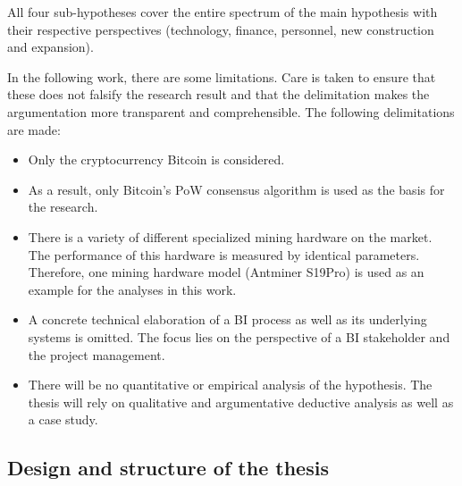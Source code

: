 All four sub-hypotheses cover the entire spectrum of the main hypothesis with their respective perspectives (technology, finance, personnel, new construction and expansion).

In the following work, there are some limitations. Care is taken to ensure that these does not falsify the research result 
and that the delimitation makes the argumentation more transparent and comprehensible. The following delimitations are made: 

\begin{itemize} 
    \item Only the cryptocurrency Bitcoin is considered. 
    \item As a result, only Bitcoin's \ac{PoW} consensus algorithm is used as the basis for the research. 
    \item There is a variety of different specialized mining hardware on the market. The performance of this hardware is measured by identical 
    parameters. Therefore, one mining hardware model (Antminer S19Pro) is used as an example for the analyses in this work. 
    \item A concrete technical elaboration of a \ac{BI} process as well as its underlying systems is omitted. The focus lies on
    the perspective of a \ac{BI} stakeholder and the project management. 
    \item There will be no quantitative or empirical analysis of the hypothesis. The thesis will rely on qualitative and argumentative 
    deductive analysis as well as a case study.
\end{itemize}

\subsection{Design and structure of the thesis} \label{toc:aufbauundstruktur}

